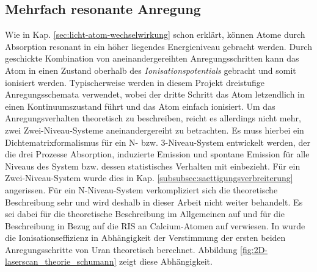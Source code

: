 \subsection{Mehrfach
resonante Anregung}\label{subsec:mehrfach_resonante_anregung}
Wie in Kap. \ref{sec:licht-atom-wechselwirkung} schon erklärt, können Atome
durch Absorption resonant in ein höher liegendes Energieniveau gebracht werden.
Durch geschickte Kombination von aneinandergereihten Anregungsschritten kann
das Atom in einen Zustand oberhalb des \textit{Ionisationspotentials} gebracht
und somit ionisiert werden. Typischerweise werden in diesem Projekt dreistufige
Anregungsschemata verwendet, wobei der dritte Schritt das Atom letzendlich in
einen Kontinuumszustand führt und das Atom einfach ionisiert. Um das
Anregungsverhalten theoretisch zu beschreiben, reicht es allerdings nicht mehr,
zwei Zwei-Niveau-Systeme aneinandergereiht zu betrachten. Es muss hierbei ein
Dichtematrixformalismus für ein N- bzw. 3-Niveau-System entwickelt werden, der
die drei Prozesse Absorption, induzierte Emission und spontane Emission für alle
Niveaus des System bzw. dessen statistisches Verhalten mit einbezieht. Für ein
Zwei-Niveau-System wurde dies in Kap. 
\ref{subsubsec:saettigungsverbreiterung} angerissen. Für ein N-Niveau-System
verkompliziert sich die theoretische Beschreibung sehr und wird deshalb in
dieser Arbeit nicht weiter behandelt. Es sei dabei für die theoretische
Beschreibung im Allgemeinen auf \cite{blum:density_matrix_theory} und für die
Beschreibung in Bezug auf die RIS an Calcium-Atomen auf
\cite{noertershaeuser:1999:dissertation} verwiesen. In
\cite{schumann:2005:dissertation} wurde die Ionisationseffizienz in Abhängigkeit
der Verstimmung der ersten beiden Anregungsschritte von Uran theoretisch
berechnet. Abbildung \ref{fig:2D-laserscan_theorie_schumann} zeigt diese
Abhängigkeit.
